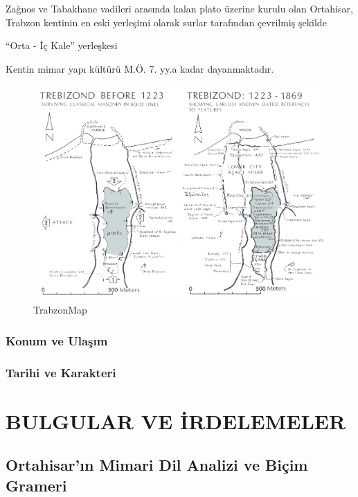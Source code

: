 \documentclass[12pt,turkish,a4paperpaper,]{report}
\begin{document}
Zağnos ve Tabakhane vadileri arasında kalan plato üzerine kurulu olan
Ortahisar, Trabzon kentinin en eski yerleşimi olarak surlar tarafından
çevrilmiş şekilde

``Orta - İç Kale'' yerleşkesi

Kentin mimar yapı kültürü M.Ö. 7. yy.a kadar dayanmaktadır.

\begin{figure}
\centering
\includegraphics[width=1\textwidth,height=\textheight]{source/figures/TrabzonMap.png}
\caption{TrabzonMap}
\end{figure}

\hypertarget{konum-ve-ulaux15fux131m}{%
\subsection{Konum ve Ulaşım}\label{konum-ve-ulaux15fux131m}}

\hypertarget{tarihi-ve-karakteri}{%
\subsection{Tarihi ve Karakteri}\label{tarihi-ve-karakteri}}

\hypertarget{bulgular-ve-irdelemeler}{%
\chapter{BULGULAR VE İRDELEMELER}\label{bulgular-ve-irdelemeler}}

\thispagestyle{empty}

\hypertarget{ortahisarux131n-mimari-dil-analizi-ve-biuxe7im-grameri}{%
\section{Ortahisar'ın Mimari Dil Analizi ve Biçim
Grameri}\label{ortahisarux131n-mimari-dil-analizi-ve-biuxe7im-grameri}}
\end{document}
